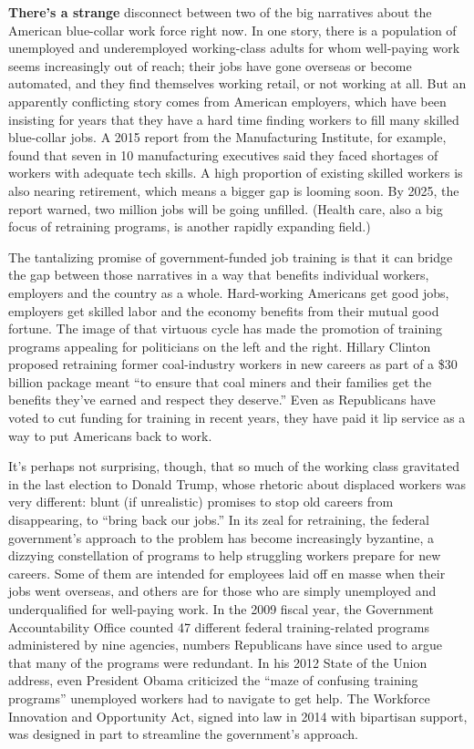 \textbf{There's a strange} disconnect between two of the big narratives
about the American blue-collar work force right now. In one story, there
is a population of unemployed and underemployed working-class adults for
whom well-paying work seems increasingly out of reach; their jobs have
gone overseas or become automated, and they find themselves working
retail, or not working at all. But an apparently conflicting story comes
from American employers, which have been insisting for years that they
have a hard time finding workers to fill many skilled blue-collar jobs.
A 2015 report from the Manufacturing Institute, for example, found that
seven in 10 manufacturing executives said they faced shortages of
workers with adequate tech skills. A high proportion of existing skilled
workers is also nearing retirement, which means a bigger gap is looming
soon. By 2025, the report warned, two million jobs will be going
unfilled. (Health care, also a big focus of retraining programs, is
another rapidly expanding field.)

The tantalizing promise of government-funded job training is that it can
bridge the gap between those narratives in a way that benefits
individual workers, employers and the country as a whole. Hard-working
Americans get good jobs, employers get skilled labor and the economy
benefits from their mutual good fortune. The image of that virtuous
cycle has made the promotion of training programs appealing for
politicians on the left and the right. Hillary Clinton proposed
retraining former coal-industry workers in new careers as part of a \$30
billion package meant ``to ensure that coal miners and their families
get the benefits they've earned and respect they deserve.'' Even as
Republicans have voted to cut funding for training in recent years, they
have paid it lip service as a way to put Americans back to work.

It's perhaps not surprising, though, that so much of the working class
gravitated in the last election to Donald Trump, whose rhetoric about
displaced workers was very different: blunt (if unrealistic) promises to
stop old careers from disappearing, to ``bring back our jobs.'' In its
zeal for retraining, the federal government's approach to the problem
has become increasingly byzantine, a dizzying constellation of programs
to help struggling workers prepare for new careers. Some of them are
intended for employees laid off en masse when their jobs went overseas,
and others are for those who are simply unemployed and underqualified
for well-paying work. In the 2009 fiscal year, the Government
Accountability Office counted 47 different federal training-related
programs administered by nine agencies, numbers Republicans have since
used to argue that many of the programs were redundant. In his 2012
State of the Union address, even President Obama criticized the ``maze
of confusing training programs'' unemployed workers had to navigate to
get help. The Workforce Innovation and Opportunity Act, signed into law
in 2014 with bipartisan support, was designed in part to streamline the
government's approach.

